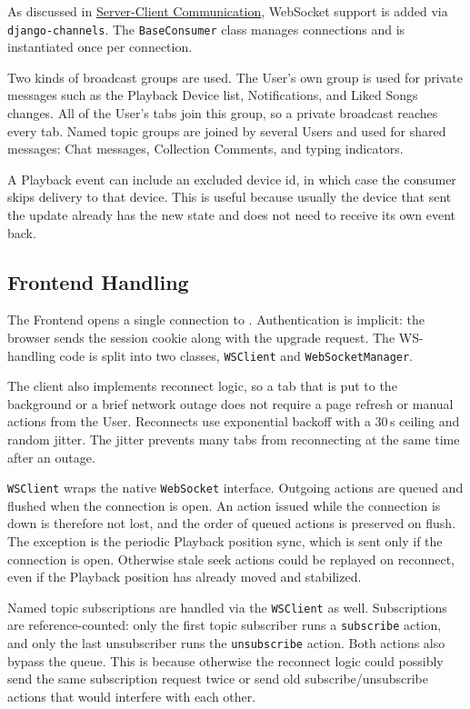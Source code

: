 As discussed in
\hyperref[sec:server_client_communication]{Server-Client Communication},
WebSocket support is added via \texttt{django-channels}. The
\texttt{BaseConsumer} class manages connections and is instantiated
once per connection.

Two kinds of broadcast groups are used. The User's own group is used
for private messages such as the Playback Device list, Notifications,
and Liked Songs changes. All of the User's tabs join this group, so a
private broadcast reaches every tab. Named topic groups are joined by
several Users and used for shared messages: Chat messages, Collection
Comments, and typing indicators.

A Playback event can include an excluded device id, in which case the
consumer skips delivery to that device. This is useful because usually the
device that sent the update already has the new state and does not
need to receive its own event back.

\subsection{Frontend Handling}
The Frontend opens a single connection to .
Authentication is implicit: the browser sends the session cookie along
with the upgrade request. The WS-handling code is split into two
classes, \texttt{WSClient} and \texttt{WebSocketManager}.

The client also implements reconnect logic, so a tab that is put to the
background or a brief network outage does not require a page refresh
or manual actions from the User. Reconnects use exponential backoff
with a 30\,s ceiling and random jitter. The jitter prevents many tabs
from reconnecting at the same time after an outage.

\texttt{WSClient} wraps the native \texttt{WebSocket} interface.
Outgoing actions are queued and flushed when the connection is open.
An action issued while the connection is down is therefore not lost,
and the order of queued actions is preserved on flush. The exception
is the periodic Playback position sync, which is sent only if the
connection is open. Otherwise stale seek actions could be replayed
on reconnect, even if the Playback position has already moved and
stabilized.

Named topic subscriptions are handled via the \texttt{WSClient} as well.
Subscriptions are reference-counted: only the first topic
subscriber runs a \texttt{subscribe} action, and only the last
unsubscriber runs the \texttt{unsubscribe} action. Both actions also bypass
the queue.
This is because otherwise the reconnect logic could possibly send the same
subscription request twice or send old subscribe/unsubscribe
actions that would interfere with each other.


